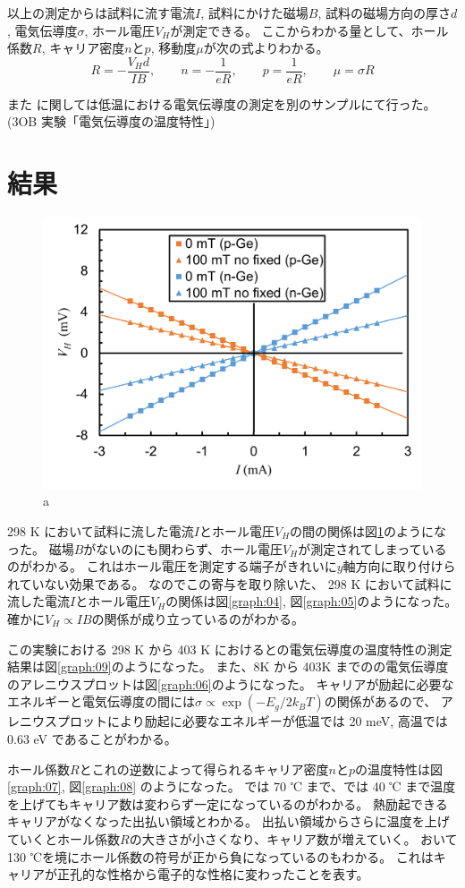 \documentclass[11pt,dvipdfmx,a4paper]{jsarticle}
\numberwithin{equation}{section}
\begin{document}
以上の測定からは試料に流す電流\(I\), 試料にかけた磁場\(B\), 試料の磁場方向の厚さ\(d\),
電気伝導度\(\sigma\), ホール電圧\(V_H\)が測定できる。
ここからわかる量として、ホール係数\(R\), キャリア密度\(n\)と\(p\), 移動度\(\mu\)が次の式よりわかる。
\begin{equation}
	R = - \frac{V_H d}{IB}, \qquad
	n = - \frac{1}{eR}, \qquad p = \frac{1}{eR}, \qquad
	\mu = \sigma R
\end{equation}

また に関しては低温における電気伝導度の測定を別のサンプルにて行った。(3OB 実験「電気伝導度の温度特性」)


\section{結果}

\begin{figure}
	\centering
	\includegraphics[width=0.4\columnwidth]{graph/graph03.png}
	\caption{a}
	\label{graph:03}
\end{figure}
298 K において試料に流した電流\(I\)とホール電圧\(V_H\)の間の関係は図\ref{graph:03}のようになった。
磁場\(B\)がないのにも関わらず、ホール電圧\(V_H\)が測定されてしまっているのがわかる。
これはホール電圧を測定する端子がきれいに\(y\)軸方向に取り付けられていない効果である。
なのでこの寄与を取り除いた、
298 K において試料に流した電流\(I\)とホール電圧\(V_H\)の関係は図\ref{graph:04}, 図\ref{graph:05}のようになった。
確かに\(V_H \propto IB\)の関係が成り立っているのがわかる。

この実験における 298 K から 403 K におけるとの電気伝導度の温度特性の測定結果は図\ref{graph:09}のようになった。
また、8K から 403K までのの電気伝導度のアレニウスプロットは図\ref{graph:06}のようになった。
キャリアが励起に必要なエネルギーと電気伝導度の間には\(\sigma\propto \exp(-E_g/2k_B T)\)の関係があるので、
アレニウスプロットにより励起に必要なエネルギーが低温では 20 meV, 高温では 0.63 eV であることがわかる。

ホール係数\(R\)とこれの逆数によって得られるキャリア密度\(n\)と\(p\)の温度特性は図\ref{graph:07}, 図\ref{graph:08} のようになった。
 では 70 ℃ まで、では 40 ℃ まで温度を上げてもキャリア数は変わらず一定になっているのがわかる。
熱励起できるキャリアがなくなった出払い領域とわかる。
出払い領域からさらに温度を上げていくとホール係数\(R\)の大きさが小さくなり、キャリア数が増えていく。
おいて 130 ℃を境にホール係数の符号が正から負になっているのもわかる。
これはキャリアが正孔的な性格から電子的な性格に変わったことを表す。
\end{document}
